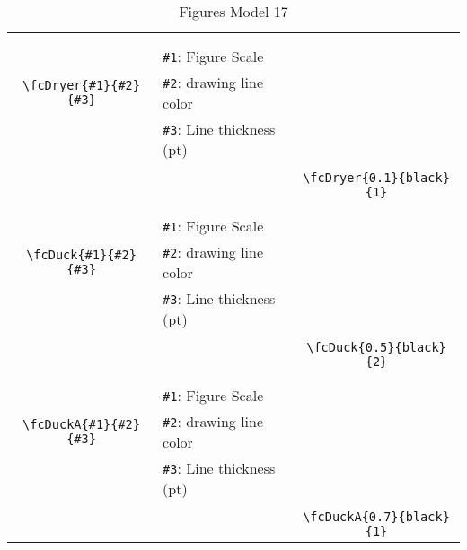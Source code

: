 \documentclass[x11names]{article}
\begin{document}
\begin{table}[H]
\begin{tabular}{|c|l|c|}
	&&\multirow{5}{*}{\fcDryer{0.1}{black}{1}}\\	&&\\	&\verb|#1|: Figure Scale &\\	\verb|\fcDryer{#1}{#2}{#3}|&	\verb|#2|: drawing line color &\\	&\verb|#3|: Line thickness (pt) &\\ &&\\&&	\verb|\fcDryer{0.1}{black}{1}|\\\hline 	
	&&\multirow{5}{*}{\fcDuck{0.5}{black}{2}}\\	&&\\	&\verb|#1|: Figure Scale &\\	\verb|\fcDuck{#1}{#2}{#3}|&	\verb|#2|: drawing line color &\\	&\verb|#3|: Line thickness (pt) &\\ &&\\&&	\verb|\fcDuck{0.5}{black}{2}|\\\hline 	
	&&\multirow{5}{*}{\fcDuckA{0.7}{black}{1}}\\	&&\\	&\verb|#1|: Figure Scale &\\	\verb|\fcDuckA{#1}{#2}{#3}|&	\verb|#2|: drawing line color &\\	&\verb|#3|: Line thickness (pt) &\\ &&\\&&	\verb|\fcDuckA{0.7}{black}{1}|\\\hline 	\hline\end{tabular}\caption{Figures Model 17}\label{tab17}\end{table}
\end{document}
